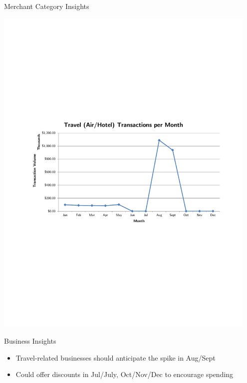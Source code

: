 \documentclass[xcolor=dvipsnames]{beamer}
\begin{document}
\begin{frame}[t]{Merchant Category Insights}
	\vspace{-4pt}
	\centerline{\includegraphics[width=0.95\textwidth]{travel-tx}}
	\vspace{-8pt}
	\begin{block}{Business Insights}
		\small
		\addtolength{\leftmargini}{-10pt}
		\begin{itemize}
			\item \hspace{-6pt} Travel-related businesses should anticipate the spike in Aug/Sept
			\vspace{-4pt}
			\item \hspace{-6pt} Could offer discounts in Jul/July, Oct/Nov/Dec to encourage spending
		\end{itemize}
	\end{block}
\end{frame}
\end{document}
